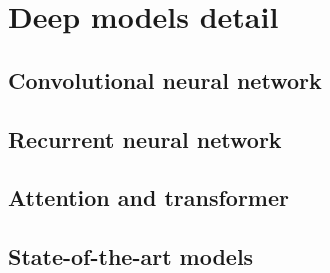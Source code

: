 \section{Deep models detail}
\label{sec:Deep models detail}
\subsection{Convolutional neural network}
\subsection{Recurrent neural network}
\subsection{Attention and transformer}

\subsection{State-of-the-art models}